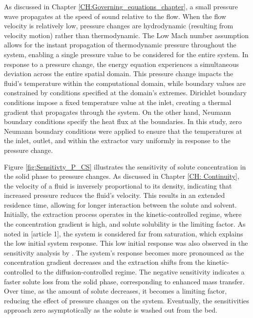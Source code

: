 \documentclass[../Article_Sensitivity_Analsysis.tex]{subfiles}
\begin{document}
	
	
	As discussed in Chapter \ref{CH:Governing_equations_chapter}, a small pressure wave propagates at the speed of sound relative to the flow. When the flow velocity is relatively low, pressure changes are hydrodynamic (resulting from velocity motion) rather than thermodynamic. The Low Mach number assumption allows for the instant propagation of thermodynamic pressure throughout the system, enabling a single pressure value to be considered for the entire system. In response to a pressure change, the energy equation experiences a simultaneous deviation across the entire spatial domain. This pressure change impacts the fluid's temperature within the computational domain, while boundary values are constrained by conditions specified at the domain's extremes. Dirichlet boundary conditions impose a fixed temperature value at the inlet, creating a thermal gradient that propagates through the system. On the other hand, Neumann boundary conditions specify the heat flux at the boundaries. In this study, zero Neumann boundary conditions were applied to ensure that the temperatures at the inlet, outlet, and within the extractor vary uniformly in response to the pressure change.
	
	Figure \ref{fig:Sensitivty_P_CS} illustrates the sensitivity of solute concentration in the solid phase to pressure changes. As discussed in Chapter \ref{CH: Continuity}, the velocity of a fluid is inversely proportional to its density, indicating that increased pressure reduces the fluid's velocity. This results in an extended residence time, allowing for longer interaction between the solute and solvent.	Initially, the extraction process operates in the kinetic-controlled regime, where the concentration gradient is high, and solute solubility is the limiting factor. As noted in [article 1], the system is considered far from saturation, which explains the low initial system response. This low initial response was also observed in the sensitivity analysis by \citet{Fiori_2007}. The system's response becomes more pronounced as the concentration gradient decreases and the extraction shifts from the kinetic-controlled to the diffusion-controlled regime. The negative sensitivity indicates a faster solute loss from the solid phase, corresponding to enhanced mass transfer.  Over time, as the amount of solute decreases, it becomes a limiting factor, reducing the effect of pressure changes on the system. Eventually, the sensitivities approach zero asymptotically as the solute is washed out from the bed.
\end{document}

